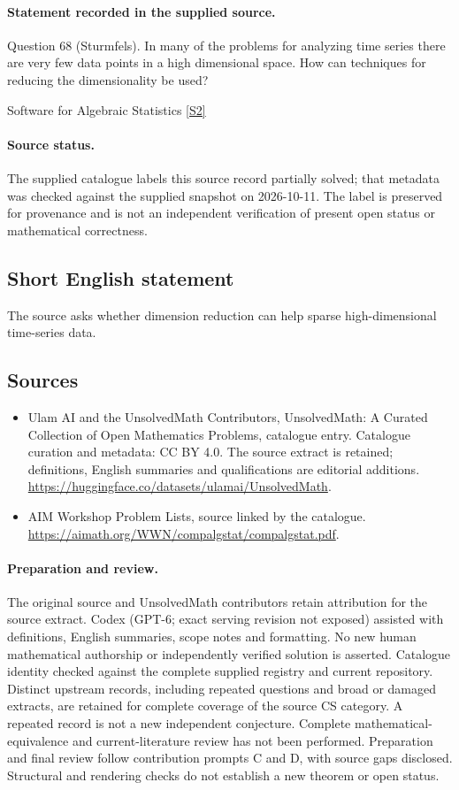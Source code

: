 \documentclass[11pt]{article}
\begin{document}
\paragraph{Statement recorded in the supplied source.}
Question 68 (Sturmfels). In many of the problems for analyzing time series there are very few data points in a high dimensional space. How can techniques for reducing the dimensionality be used?

Software for Algebraic Statistics \href{https://aimath.org/WWN/compalgstat/compalgstat.pdf}{[S2]}
\paragraph{Source status.}
The supplied catalogue labels this source record partially solved; that metadata was checked against the supplied snapshot on 2026-10-11. The label is preserved for provenance and is not an independent verification of present open status or mathematical correctness.
\subsection{Short English statement}
The source asks whether dimension reduction can help sparse high-dimensional time-series data.
\subsection{Sources}
\begin{itemize}
\item[S1] Ulam AI and the UnsolvedMath Contributors, UnsolvedMath: A Curated Collection of Open Mathematics Problems, catalogue entry. Catalogue curation and metadata: CC BY 4.0. The source extract is retained; definitions, English summaries and qualifications are editorial additions.
\url{https://huggingface.co/datasets/ulamai/UnsolvedMath}.
\item[S2] AIM Workshop Problem Lists, source linked by the catalogue.
\url{https://aimath.org/WWN/compalgstat/compalgstat.pdf}.
\end{itemize}
\paragraph{Preparation and review.}
The original source and UnsolvedMath contributors retain attribution for the source extract. Codex (GPT-6; exact serving revision not exposed) assisted with definitions, English summaries, scope notes and formatting. No new human mathematical authorship or independently verified solution is asserted. Catalogue identity checked against the complete supplied registry and current repository. Distinct upstream records, including repeated questions and broad or damaged extracts, are retained for complete coverage of the source CS category. A repeated record is not a new independent conjecture. Complete mathematical-equivalence and current-literature review has not been performed. Preparation and final review follow contribution prompts C and D, with source gaps disclosed. Structural and rendering checks do not establish a new theorem or open status.
\label{end:statement}
\end{document}

